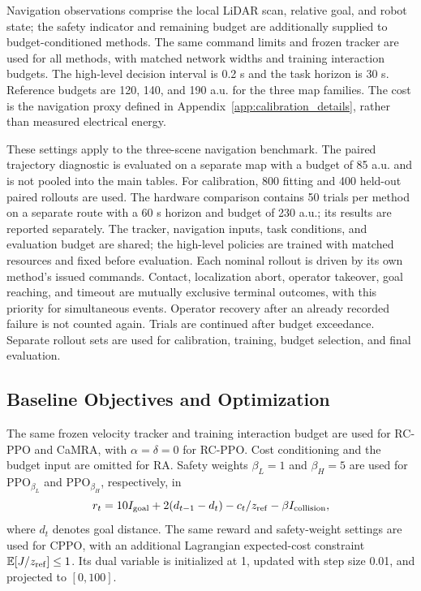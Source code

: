 \documentclass[conference]{IEEEtran}
\begin{document}
Navigation observations comprise the local LiDAR scan, relative goal, and robot
state; the safety indicator and remaining budget are additionally supplied to
budget-conditioned methods. The same command limits and frozen tracker are used for all methods,
with matched network widths and training interaction budgets. The high-level
decision interval is 0.2 s and the task horizon is 30 s. Reference budgets are
120, 140, and 190 a.u. for the three map families. The cost is the navigation
proxy defined in Appendix~\ref{app:calibration_details}, rather than measured
electrical energy.

These settings apply to the three-scene navigation benchmark. The paired
trajectory diagnostic is evaluated on a separate map with a budget of 85 a.u. and is not
pooled into the main tables. For calibration, 800 fitting and 400 held-out
paired rollouts are used. The hardware comparison contains 50 trials per method on a
separate route with a 60 s horizon and budget of 230 a.u.; its results are
reported separately. The tracker, navigation inputs, task conditions, and
evaluation budget are shared; the high-level policies are trained with matched
resources and fixed before evaluation. Each nominal rollout is driven by its own
method's issued commands. Contact, localization abort, operator takeover, goal
reaching, and timeout are mutually exclusive terminal outcomes, with this
priority for simultaneous events. Operator recovery after an already recorded
failure is not counted again. Trials are continued after budget exceedance.
Separate rollout sets are used for calibration, training, budget selection,
and final evaluation.

\subsection{Baseline Objectives and Optimization}
The same frozen velocity tracker and training interaction budget are used for
RC-PPO and CaMRA, with $\alpha=\delta=0$ for RC-PPO. Cost conditioning and the
budget input are omitted for RA. Safety weights $\beta_L=1$ and $\beta_H=5$
are used for PPO$_{\beta_L}$ and PPO$_{\beta_H}$, respectively, in
\[
r_t=10I_{\rm goal}+2(d_{t-1}-d_t)-c_t/z_{\rm ref}
-\beta I_{\rm collision},
\]
where $d_t$ denotes goal distance. The same reward and safety-weight settings
are used for CPPO, with an additional Lagrangian expected-cost constraint
$\mathbb E[J/z_{\rm ref}]\leq1$. Its dual variable is initialized at 1,
updated with step size 0.01, and projected to $[0,100]$.
\end{document}
